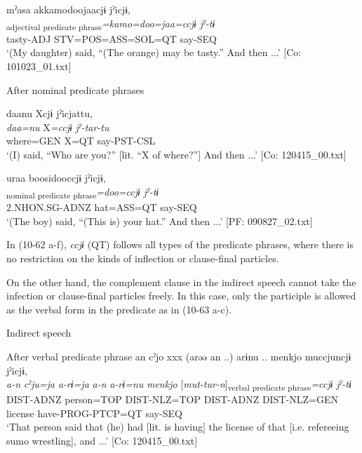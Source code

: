 \begin{xlist}
\begin{xlist}
  \ex  %
      \glll    mˀasa  akkamodoojaacjɨ  jˀicjɨ,\\
      [\textit{mˀa-sa}  \textit{ar}]\textsubscript{adjectival predicate phrase}\textit{=kamo=doo=jaa=ccjɨ}  \textit{jˀ{}-tɨ}\\
      tasty-ADJ  STV=POS=ASS=SOL=QT  say-SEQ\\
      \glt       ‘(My daughter) said, “(The orange) may be tasty.” And then ...’ [Co: 101023\_01.txt]

  \exi{} After nominal predicate phrases

  \ex  %
      \glll    daanu  Xcjɨ  jˀicjattu,\\
      \textit{daa=nu}  X\textit{=ccjɨ}  \textit{jˀ-tar-tu}\\
      where=GEN  X=QT  say-PST-CSL\\
      \glt       ‘(I) said, “Who are you?” [lit. “X of where?”] And then ...’ [Co: 120415\_00.txt]

  \ex %
      \glll    uraa  {\textbar}boosi{\textbar}dooccjɨ  jˀicjɨ,\\
      [\textit{ura-a}  \textit{boosi}]\textsubscript{nominal predicate phrase}\textit{=doo=ccjɨ}  \textit{jˀ{}-tɨ}\\
      2.NHON.SG-ADNZ  hat=ASS=QT  say-SEQ\\
      \glt       ‘(The boy) said, “(This is) your hat.” And then ...’ [PF: 090827\_02.txt]
  \end{xlist}
\z

In (10-62 a-f), \textit{ccjɨ} (QT) follows all types of the predicate phrases, where there is no restriction on the kinds of inflection or clause-final particles.

On the other hand, the complement clause in the indirect speech cannot take the infection or clause-final particles freely. In this case, only the participle is allowed as the verbal form in the predicate as in (10-63 a-c).

\ea\label{ex:10.63}   Indirect speech\\
  \begin{xlist}
  \exi{} After verbal predicate phrase
    \ex  %
      \glll    an  cˀjo  xxx  (arəə  an ..)   arɨnu ..  {\textbar}menkjo{\textbar}  muccjuncjɨ  jˀicjɨ,\\
      \textit{a-n}  \textit{cˀju=ja}    \textit{a-rɨ=ja}  \textit{a-n}   \textit{a-rɨ=nu}  \textit{menkjo}  [\textit{mut-tur-n}]\textsubscript{verbal predicate phrase}\textit{=ccjɨ}  \textit{jˀ{}-tɨ}\\
      DIST-ADNZ  person=TOP    DIST-NLZ=TOP  DIST-ADNZ   DIST-NLZ=GEN  license  have-PROG-PTCP=QT  say-SEQ\\
      \glt       ‘That person said that (he) had [lit. is having] the license of that [i.e. refereeing sumo wrestling], and ...’ [Co: 120415\_00.txt]


\end{xlist}
\end{xlist}
